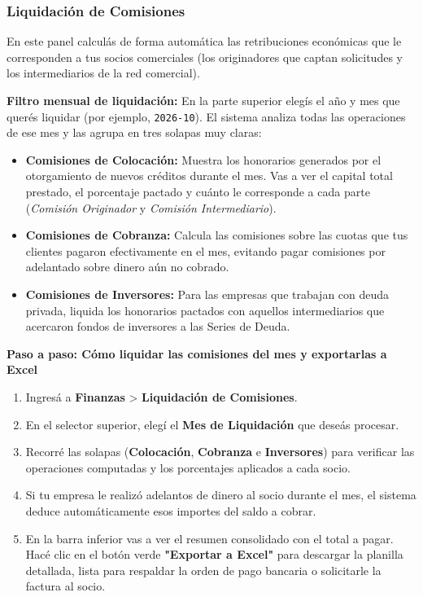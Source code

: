 \documentclass[12pt,a4paper]{article}
\renewcommand{\_}{\textunderscore\allowbreak}
\begin{document}
\subsubsection{Liquidación de Comisiones}
En este panel calculás de forma automática las retribuciones económicas que le corresponden a tus socios comerciales (los originadores que captan solicitudes y los intermediarios de la red comercial).

\textbf{Filtro mensual de liquidación:}
En la parte superior elegís el año y mes que querés liquidar (por ejemplo, \texttt{2026-10}). El sistema analiza todas las operaciones de ese mes y las agrupa en tres solapas muy claras:
\begin{itemize}
    \item \textbf{Comisiones de Colocación:} Muestra los honorarios generados por el otorgamiento de nuevos créditos durante el mes. Vas a ver el capital total prestado, el porcentaje pactado y cuánto le corresponde a cada parte (\textit{Comisión Originador} y \textit{Comisión Intermediario}).
    \item \textbf{Comisiones de Cobranza:} Calcula las comisiones sobre las cuotas que tus clientes pagaron efectivamente en el mes, evitando pagar comisiones por adelantado sobre dinero aún no cobrado.
    \item \textbf{Comisiones de Inversores:} Para las empresas que trabajan con deuda privada, liquida los honorarios pactados con aquellos intermediarios que acercaron fondos de inversores a las Series de Deuda.
\end{itemize}

\textbf{Paso a paso: Cómo liquidar las comisiones del mes y exportarlas a Excel}
\begin{enumerate}
    \item Ingresá a \textbf{Finanzas} > \textbf{Liquidación de Comisiones}.
    \item En el selector superior, elegí el \textbf{Mes de Liquidación} que deseás procesar.
    \item Recorré las solapas (\textbf{Colocación}, \textbf{Cobranza} e \textbf{Inversores}) para verificar las operaciones computadas y los porcentajes aplicados a cada socio.
    \item Si tu empresa le realizó adelantos de dinero al socio durante el mes, el sistema deduce automáticamente esos importes del saldo a cobrar.
    \item En la barra inferior vas a ver el resumen consolidado con el total a pagar. Hacé clic en el botón verde \textbf{"Exportar a Excel"} para descargar la planilla detallada, lista para respaldar la orden de pago bancaria o solicitarle la factura al socio.
\end{enumerate}
\end{document}

